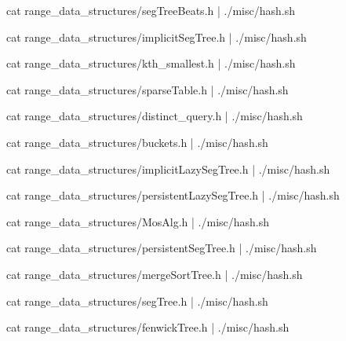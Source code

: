 \documentclass[12pt,letterpaper,twocolumn,landscape]{article}
\begin{document}

cat range_data_structures/segTreeBeats.h | ./misc/hash.sh
\END

cat range_data_structures/implicitSegTree.h | ./misc/hash.sh
\END

cat range_data_structures/kth_smallest.h | ./misc/hash.sh
\END

cat range_data_structures/sparseTable.h | ./misc/hash.sh
\END

cat range_data_structures/distinct_query.h | ./misc/hash.sh
\END

cat range_data_structures/buckets.h | ./misc/hash.sh
\END

cat range_data_structures/implicitLazySegTree.h | ./misc/hash.sh
\END

cat range_data_structures/persistentLazySegTree.h | ./misc/hash.sh
\END

cat range_data_structures/MosAlg.h | ./misc/hash.sh
\END

cat range_data_structures/persistentSegTree.h | ./misc/hash.sh
\END

cat range_data_structures/mergeSortTree.h | ./misc/hash.sh
\END

cat range_data_structures/segTree.h | ./misc/hash.sh
\END

cat range_data_structures/fenwickTree.h | ./misc/hash.sh
\END

\end{document}
